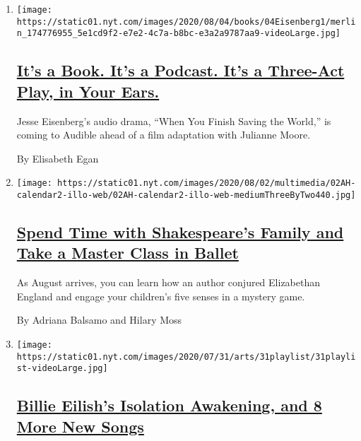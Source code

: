 \begin{enumerate}
\def\labelenumi{\arabic{enumi}.}
\item
  \texttt{[image: https://static01.nyt.com/images/2020/08/04/books/04Eisenberg1/merlin\_174776955\_5e1cd9f2-e7e2-4c7a-b8bc-e3a2a9787aa9-videoLarge.jpg]}

  \hypertarget{its-a-book-its-a-podcast-its-a-three-act-play-in-your-ears}{%
  \subsection{\texorpdfstring{\href{/2020/08/02/books/jesse-eisenberg-when-you-finish-saving-the-world-audio.html}{It's
  a Book. It's a Podcast. It's a Three-Act Play, in Your
  Ears.}}{It's a Book. It's a Podcast. It's a Three-Act Play, in Your Ears.}}\label{its-a-book-its-a-podcast-its-a-three-act-play-in-your-ears}}

  Jesse Eisenberg's audio drama, ``When You Finish Saving the World,''
  is coming to Audible ahead of a film adaptation with Julianne Moore.

  By Elisabeth Egan
\item
  \texttt{[image: https://static01.nyt.com/images/2020/08/02/multimedia/02AH-calendar2-illo-web/02AH-calendar2-illo-web-mediumThreeByTwo440.jpg]}

  \hypertarget{spend-time-with-shakespeares-family-and-take-a-master-class-in-ballet}{%
  \subsection{\texorpdfstring{\href{/2020/08/01/at-home/coronavirus-things-to-do-this-week.html}{Spend
  Time with Shakespeare's Family and Take a Master Class in
  Ballet}}{Spend Time with Shakespeare's Family and Take a Master Class in Ballet}}\label{spend-time-with-shakespeares-family-and-take-a-master-class-in-ballet}}

  As August arrives, you can learn how an author conjured Elizabethan
  England and engage your children's five senses in a mystery game.

  By Adriana Balsamo and Hilary Moss
\item
  \texttt{[image: https://static01.nyt.com/images/2020/07/31/arts/31playlist/31playlist-videoLarge.jpg]}

  \hypertarget{billie-eilishs-isolation-awakening-and-8-more-new-songs}{%
  \subsection{\texorpdfstring{\href{/2020/07/31/arts/music/playlist-billie-eilish-snakehips-a-boogie.html}{Billie
  Eilish's Isolation Awakening, and 8 More New
  Songs}}{Billie Eilish's Isolation Awakening, and 8 More New Songs}}\label{billie-eilishs-isolation-awakening-and-8-more-new-songs}}


\end{enumerate}
